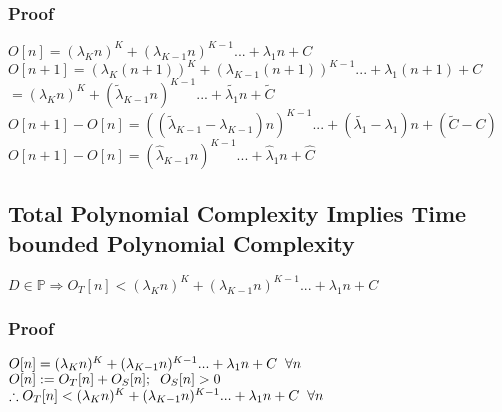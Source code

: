 \documentclass[11pt]{article}
\begin{document}
\subsubsection{Proof}
\begin{center}
$
O[n] = (\lambda_K n)^K + (\lambda_{K-1} n)^{K-1}... + \lambda_1 n + C
$
\\ \vspace{2mm}
$
O[n+1] = (\lambda_K (n+1))^K + (\lambda_{K-1} (n+1))^{K-1}... + \lambda_1 (n+1) + C
$
\\ \vspace{2mm}
$ 
=  (\lambda_K n)^K + (\tilde{\lambda}_{K-1} n)^{K-1}... + \tilde{\lambda_1} n + \tilde{C}
$
\\ \vspace{2mm}
$
O[n+1] - O[n] = ((\tilde{\lambda}_{K-1}- \lambda_{K-1})n)^{K-1}... + (\tilde{\lambda_1} - \lambda_1) n + (\tilde{C} - C)
$
\\ \vspace{2mm}
$
O[n+1] - O[n] = (\hat{\lambda}_{K-1}n)^{K-1}... + \hat{\lambda}_1  n + \hat{C}
$
\end{center}







\subsection{Total Polynomial Complexity Implies Time bounded Polynomial Complexity}
\begin{center}
\vspace{1mm}
$
D \in \mathbb{P} \Longrightarrow O_T[n] < (\lambda_K n)^K + (\lambda_{K-1} n)^{K-1}... + \lambda_1 n + C
$
\end{center}

\subsubsection{Proof}
\begin{center}
$
O[n] = (\lambda_K n)^K + (\lambda_{K-1} n)^{K-1}... + \lambda_1 n + C \hspace{2mm} \forall n
$
\\ \vspace{2mm}
$
O[n] := O_T[n] + O_S[n]; \hspace{2mm} O_S[n] > 0
$
\\ \vspace{2mm}
$
\therefore O_T[n] < (\lambda_K n)^K + (\lambda_{K-1} n)^{K-1}... + \lambda_1 n + C \hspace{2mm} \forall n
$
\end{center}
\end{document}
